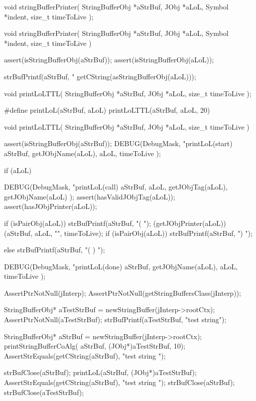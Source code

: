
\startCHeader
void stringBufferPrinter(
  StringBufferObj *aStrBuf,
  JObj            *aLoL,
  Symbol          *indent,
  size_t           timeToLive
);
\stopCHeader

\startCCode
void stringBufferPrinter(
  StringBufferObj *aStrBuf,
  JObj            *aLoL,
  Symbol          *indent,
  size_t           timeToLive
) {
  assert(isStringBufferObj(aStrBuf));
  assert(isStringBufferObj(aLoL));

  strBufPrintf(aStrBuf, "%
    getCString(asStringBufferObj(aLoL)));
}
\stopCCode

\startCHeader
void printLoLTTL(
  StringBufferObj *aStrBuf,
  JObj            *aLoL,
  size_t           timeToLive
);

#define printLoL(aStrBuf, aLoL) printLoLTTL(aStrBuf, aLoL, 20)
\stopCHeader

\startCCode
void printLoLTTL(
  StringBufferObj *aStrBuf,
  JObj            *aLoL,
  size_t           timeToLive
) {
  assert(isStringBufferObj(aStrBuf));
  DEBUG(DebugMask,
    "printLoL(start) %
    aStrBuf, getJObjName(aLoL), aLoL, timeToLive
  );

  if (aLoL) {
    DEBUG(DebugMask,
      "printLoL(call) %
      aStrBuf, aLoL, getJObjTag(aLoL), getJObjName(aLoL)
    );
    assert(hasValidJObjTag(aLoL));
    assert(hasJObjPrinter(aLoL));

    if (isPairObj(aLoL)) strBufPrintf(aStrBuf, "( ");
    (getJObjPrinter(aLoL))
      (aStrBuf, aLoL, "", timeToLive);
    if (isPairObj(aLoL)) strBufPrintf(aStrBuf, ") ");
  } else strBufPrintf(aStrBuf, "( ) ");

  DEBUG(DebugMask,
    "printLoL(done) %
    aStrBuf, getJObjName(aLoL), aLoL, timeToLive
  );
}
\stopCCode
{}

\startCTest
  AssertPtrNotNull(jInterp);
  AssertPtrNotNull(getStringBuffersClass(jInterp));

  StringBufferObj* aTestStrBuf = newStringBuffer(jInterp->rootCtx);
  AssertPtrNotNull(aTestStrBuf);
  strBufPrintf(aTestStrBuf, "test string");
  
  StringBufferObj* aStrBuf = newStringBuffer(jInterp->rootCtx);
  printStringBufferCoAlg(
    aStrBuf, (JObj*)aTestStrBuf, 10);
  AssertStrEquals(getCString(aStrBuf), "test string ");
  
  strBufClose(aStrBuf);
  printLoL(aStrBuf, (JObj*)aTestStrBuf);
  AssertStrEquals(getCString(aStrBuf), "test string ");
  strBufClose(aStrBuf);
  strBufClose(aTestStrBuf);
\stopCTest
\skipTestCase
\stopTestSuite
